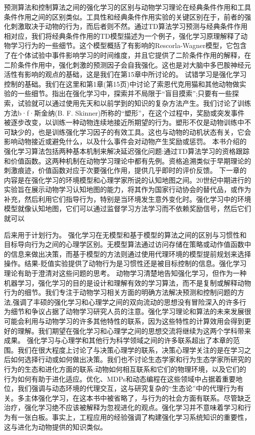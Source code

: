 预测算法和控制算法之间的强化学习的区别与动物学习理论在经典条件作用和工具条件作用之间的区别类似。工具性和经典条件作用实验的关键区别在于，前者的强化刺激取决于动物的行为，而后者则不然。通过TD算法学习预测与经典条件作用相对应，我们将经典条件作用的TD模型描述为一个例子，强化学习原理解释了动物学习行为的一些细节。这个模型概括了有影响的Rescorla-Wagner模型，它包含了在个体试验中事件影响学习的时间维度，并且它提供了二阶条件作用的解释，在二阶条件作用中，强化刺激的预测因子会自我强化。这也是对大脑中多巴胺神经元活性有影响的观点的基础，这是我们在第15章中所讨论的。
试错学习是强化学习控制的基础。我们在这里和第1章(第15页)中讨论了索恩代克用猫和其他动物做实验的一些细节。指出在强化学习中，探索并不局限于“盲目摸索”;只要有一些探索，试验就可以通过使用先天和以前学到的知识的复杂方法产生。我们讨论了训练方法b·f·斯金纳(B. F. Skinner)所称的“塑形”，在这个过程中，奖励或突发事件被逐步改变，以训练一种动物连续地接近所期望的行为。塑形不仅是动物训练中不可缺少的，也是训练强化学习因子的有效工具。这也与动物的动机状态有关，它会影响动物接近或避免什么，以及什么事件会对动物产生奖励或惩罚。
本书介绍的强化学习算法包括两种基本机制来解决延迟强化问题:通过TD算法学习的资格跟踪和价值函数。这两种机制在动物学习理论中都有先例。资格追溯类似于早期理论的刺激痕迹，价值函数对应于次要强化作用，提供几乎即时的评价反馈。
下一章的内容是在强化学习的环境模型和心理学家所说的认知地图之间。20世纪中期进行的实验旨在展示动物学习认知地图的能力，将其作为国家行动协会的替代品，或作为补充，然后利用它们指导行为，特别是当环境发生意外变化时。强化学习中的环境模型就像认知地图，它们可以通过监督学习方法学习而不依赖奖励信号，然后它们就可以

后来用于计划行为。
强化学习在无模型和基于模型的算法之间的区别与习惯性和目标导向行为之间的心理学区别。无模型算法通过访问存储在策略或动作值函数中的信息来做出决策，而基于模型的方法则通过使用代理环境的模型提前规划来选择操作。结果-贬值实验提供了动物行为是习惯性还是被目标控制的信息。强化学习理论有助于澄清对这些问题的思考。
动物学习清楚地告知强化学习，但作为一种机器学习，强化学习的目的是设计和理解有效的学习算法，而不是复制或解释动物行为的细节。我们专注于动物学习相关方面的明确方法解决预测和控制问题的方法,强调了丰硕的强化学习和心理学之间的双向流动的思想没有冒险深入的许多行为细节和争议占据了动物学习研究人员的注意。强化学习理论和算法的未来发展很可能会利用与动物学习的许多其他特性的联系，因为这些特性的计算效用会得到更好的理解。我们期望在强化学习和心理学之间的思想交流将继续为这两个学科带来成果。
强化学习与心理学和其他行为科学领域之间的许多联系超出了本章的范围。我们在很大程度上讨论了与决策心理学的联系，决策心理学关注的是在学习之后如何选择行动或如何做出决策。我们也不讨论生态学家和行为生态学家所研究的行为的生态和进化方面的联系:动物如何相互联系和它们的物理环境，以及它们的行为如何有助于进化适应。优化、MDPs和动态编程在这些领域中占据着重要地位，我们强调与动态环境的代理交互，这与研究复杂的“生态论”中的代理行为有关。多主体强化学习，在这本书中被省略了，与行为的社会方面有联系。尽管缺乏治疗，强化学习绝不应该被解释为忽视进化的观点。强化学习并不意味着学习和行为有一张白板。事实上，工程应用的经验强调了构建强化学习系统知识的重要性，这与进化为动物提供的知识类似。

